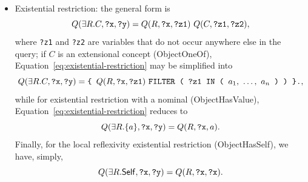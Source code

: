 \documentclass[a4paper]{article}
\newcounter{ex}
\begin{document}
\begin{itemize}
\item Existential restriction: the general form is
  \begin{equation}\label{eq:existential-restriction}
    Q(\exists R.C, \mbox{\tt ?x}, \mbox{\tt ?y}) =
      Q(R, \mbox{\tt ?x}, \mbox{\tt ?z1})\ Q(C, \mbox{\tt ?z1}, \mbox{\tt ?z2}),
  \end{equation}
  where \texttt{?z1} and \texttt{?z2} are variables that do not occur anywhere else in the query;
  if $C$ is an extensional concept (\textsf{ObjectOneOf}), Equation~\ref{eq:existential-restriction}
  may be simplified into
  \begin{equation}\label{eq:existential-restriction-extensional}
    Q(\exists R.C, \mbox{\tt ?x}, \mbox{\tt ?y}) =
      \mbox{\tt \{\ } Q(R, \mbox{\tt ?x}, \mbox{\tt ?z1})\ 
      \mbox{\tt FILTER ( ?z1 IN ( } a_1,\ \ldots,\ a_n \mbox{\tt\ ) ) \}.},
  \end{equation}
  while for existential restriction with a nominal (\textsf{ObjectHasValue}),
  Equation~\ref{eq:existential-restriction} reduces to
  \begin{equation}\label{eq:existential-restriction-nominal}
    Q(\exists R.\{a\}, \mbox{\tt ?x}, \mbox{\tt ?y}) = Q(R, \mbox{\tt ?x}, a).
  \end{equation}
  Finally, for the local reflexivity existential restriction (\textsf{ObjectHasSelf}), we have, simply,
  \begin{equation}\label{eq:local-reflexivity-existential-restriction}
    Q(\exists R.\mathsf{Self}, \mbox{\tt ?x}, \mbox{\tt ?y}) =
      Q(R, \mbox{\tt ?x}, \mbox{\tt ?x}).
  \end{equation}


\end{itemize}
\end{document}
